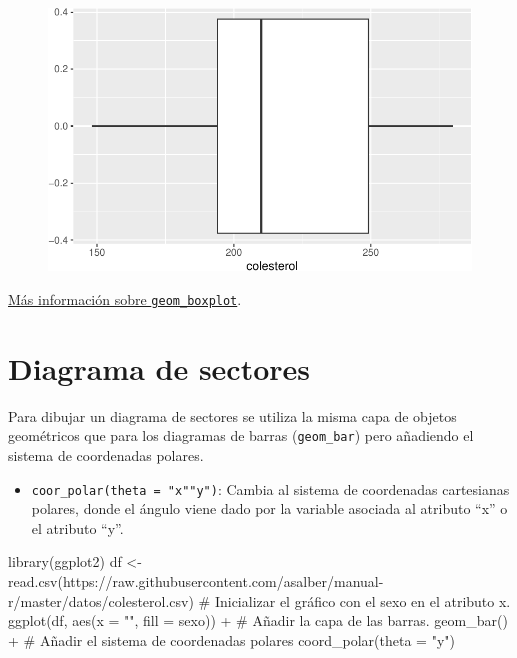 \documentclass[
  a4paper,
]{scrreport}
\newenvironment{Shaded}{\begin{snugshade}}{\end{snugshade}}
\newcommand{\AttributeTok}[1]{\textcolor[rgb]{0.40,0.45,0.13}{#1}}
\newcommand{\CommentTok}[1]{\textcolor[rgb]{0.37,0.37,0.37}{#1}}
\newcommand{\FunctionTok}[1]{\textcolor[rgb]{0.28,0.35,0.67}{#1}}
\newcommand{\NormalTok}[1]{\textcolor[rgb]{0.00,0.23,0.31}{#1}}
\newcommand{\OtherTok}[1]{\textcolor[rgb]{0.00,0.23,0.31}{#1}}
\newcommand{\SpecialCharTok}[1]{\textcolor[rgb]{0.37,0.37,0.37}{#1}}
\newcommand{\StringTok}[1]{\textcolor[rgb]{0.13,0.47,0.30}{#1}}
\providecommand{\tightlist}{%
  \setlength{\itemsep}{0pt}\setlength{\parskip}{0pt}}\usepackage{longtable,booktabs,array}
\theoremstyle{definition}
\theoremstyle{definition}
\theoremstyle{remark}
\begin{document}
\begin{figure}[H]

{\centering \includegraphics{./07-graficos_files/figure-pdf/unnamed-chunk-21-1.pdf}

}

\end{figure}

\href{https://ggplot2.tidyverse.org/reference/geom_boxplot.html}{Más
información sobre \texttt{geom\_boxplot}}.

\hypertarget{diagrama-de-sectores}{%
\section{Diagrama de sectores}\label{diagrama-de-sectores}}

Para dibujar un diagrama de sectores se utiliza la misma capa de objetos
geométricos que para los diagramas de barras (\texttt{geom\_bar}) pero
añadiendo el sistema de coordenadas polares.

\begin{itemize}
\tightlist
\item
  \texttt{coor\_polar(theta\ =\ "x"\textbar{}"y")}: Cambia al sistema de
  coordenadas cartesianas polares, donde el ángulo viene dado por la
  variable asociada al atributo ``x'' o el atributo ``y''.
\end{itemize}

\begin{Shaded}
\begin{Highlighting}[]
\FunctionTok{library}\NormalTok{(ggplot2)}
\NormalTok{df }\OtherTok{\textless{}{-}} \FunctionTok{read.csv}\NormalTok{(}\StringTok{\textquotesingle{}https://raw.githubusercontent.com/asalber/manual{-}r/master/datos/colesterol.csv\textquotesingle{}}\NormalTok{)}
\CommentTok{\# Inicializar el gráfico con el sexo en el atributo x.}
\FunctionTok{ggplot}\NormalTok{(df, }\FunctionTok{aes}\NormalTok{(}\AttributeTok{x =} \StringTok{""}\NormalTok{, }\AttributeTok{fill =}\NormalTok{ sexo)) }\SpecialCharTok{+}
\CommentTok{\# Añadir la capa de las barras.}
    \FunctionTok{geom\_bar}\NormalTok{() }\SpecialCharTok{+}
\CommentTok{\# Añadir el sistema de coordenadas polares}
    \FunctionTok{coord\_polar}\NormalTok{(}\AttributeTok{theta =} \StringTok{"y"}\NormalTok{)}
\end{Highlighting}
\end{Shaded}
\end{document}

